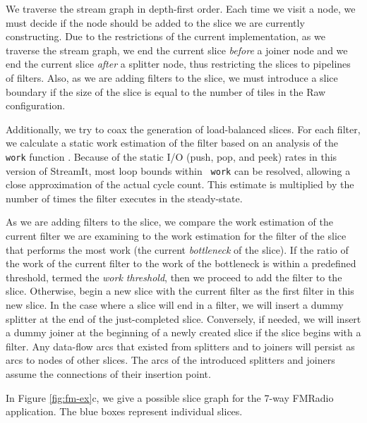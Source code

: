 We traverse the stream graph in depth-first order.  Each time we visit
a node, we must decide if the node should be added to the slice we are
currently constructing.  Due to the restrictions of the current
implementation, as we traverse the stream graph, we end the current
slice {\it before} a joiner node and we end the current slice {\it
after} a splitter node, thus restricting the slices to pipelines of
filters.  Also, as we are adding filters to the slice, we must
introduce a slice boundary if the size of the slice is equal to the
number of tiles in the Raw configuration.

Additionally, we try to coax the generation of load-balanced slices.
For each filter, we calculate a static work estimation of the filter
based on an analysis of the {\tt work} function
\cite{streamit-asplos}.  Because of the static I/O (push, pop, and
peek) rates in this version of StreamIt, most loop bounds within {\tt
work} can be resolved, allowing a close approximation of the actual
cycle count.  This estimate is multiplied by the number of times the
filter executes in the steady-state.

As we are adding filters to the slice, we compare the work estimation
of the current filter we are examining to the work estimation for the
filter of the slice that performs the most work (the current {\it
bottleneck} of the slice).  If the ratio of the work of the current
filter to the work of the bottleneck is within a predefined threshold,
termed the {\it work threshold}, then we proceed to add the filter to
the slice.  Otherwise, begin a new slice with the current filter as
the first filter in this new slice. In the case where a slice will end
in a filter, we will insert a dummy splitter at the end of the
just-completed slice.  Conversely, if needed, we will insert a dummy
joiner at the beginning of a newly created slice if the slice begins
with a filter. Any data-flow arcs that existed from splitters and to
joiners will persist as arcs to nodes of other slices.  The arcs of
the introduced splitters and joiners assume the connections of their
insertion point.

In Figure \ref{fig:fm-ex}c, we give a possible slice graph for the
7-way FMRadio application.  The blue boxes represent individual
slices.

